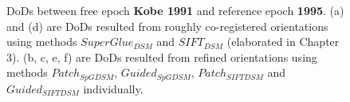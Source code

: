 \begin{figure}[htbp]
\begin{center}
		\caption{{\scriptsize \ac{DoD}s between free epoch \textbf{Kobe 1991} and reference epoch \textbf{1995}. (a) and (d) are \ac{DoD}s resulted from roughly co-registered orientations using methods $SuperGlue_{DSM}$ and $SIFT_{DSM}$ (elaborated in Chapter 3). (b, c, e, f) are \ac{DoD}s resulted from refined orientations using methods $Patch_{SpGDSM}$, $Guided_{SpGDSM}$, $Patch_{SIFTDSM}$ and $Guided_{SIFTDSM}$ individually.}}
		\label{DoDKobe}
	\end{center}
\end{figure} 

